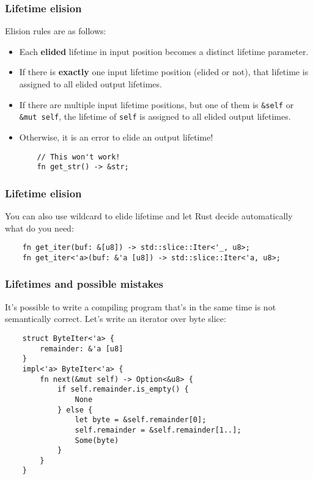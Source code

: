 \documentclass[aspectratio=1610,t]{beamer}
\begin{document}

\begin{frame}[fragile]
\frametitle{Lifetime elision}
Elision rules are as follows:

\begin{itemize}
    \item Each \textbf{elided} lifetime in input position becomes a distinct lifetime parameter.
    \item If there is \textbf{exactly} one input lifetime position (elided or not), that lifetime is assigned to all elided output lifetimes.
    \item If there are multiple input lifetime positions, but one of them is \texttt{\&self} or \texttt{\&mut self}, the lifetime of \texttt{self} is assigned to all elided output lifetimes.
    \item Otherwise, it is an error to elide an output lifetime!
    
    \begin{verbatim}
    // This won't work!
    fn get_str() -> &str; 
    \end{verbatim}
\end{itemize}
\end{frame}


\begin{frame}[fragile]
\frametitle{Lifetime elision}
You can also use wildcard to elide lifetime and let Rust decide automatically what do you need:

\begin{verbatim}
    fn get_iter(buf: &[u8]) -> std::slice::Iter<'_, u8>;
    fn get_iter<'a>(buf: &'a [u8]) -> std::slice::Iter<'a, u8>;
\end{verbatim}
\end{frame}


\begin{frame}[fragile]
\frametitle{Lifetimes and possible mistakes}
It's possible to write a compiling program that's in the same time is not semantically correct. Let's write an iterator over byte slice:

\begin{verbatim}
    struct ByteIter<'a> {
        remainder: &'a [u8]
    }
    impl<'a> ByteIter<'a> {
        fn next(&mut self) -> Option<&u8> {
            if self.remainder.is_empty() {
                None
            } else {
                let byte = &self.remainder[0];
                self.remainder = &self.remainder[1..];
                Some(byte)
            }
        }
    }
\end{verbatim}
\end{frame}
\end{document}
